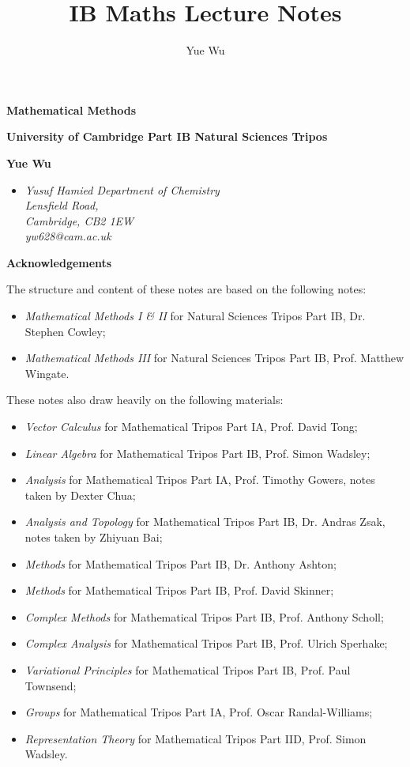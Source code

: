 \documentclass{article}
\title{IB Maths Lecture Notes}
\author{Yue Wu}
\theoremstyle{plain}\theoremheaderfont{\normalfont\itshape}\theorembodyfont{\rmfamily}\theoremseparator{.}\newtheorem*{rem}{Remark}\newtheorem*{ex}{Example}\newtheorem*{proof}{Proof}\newtheorem*{altp}{Alternative proof}
\theoremstyle{plain}\theoremheaderfont{\normalfont\bfseries}\theorembodyfont{\rmfamily}\theoremseparator{.}\newtheorem{thm}{Theorem}[section]\newtheorem{lem}[thm]{Lemma}\newtheorem{prop}[thm]{Proposition}\newtheorem*{cor}{Corollary}\newtheorem{defn}[thm]{Definition}\newtheorem{clm}[thm]{Claim}\newtheorem{clminproof}{Claim}
\theoremstyle{break}\theoremheaderfont{\normalfont\itshape}\theorembodyfont{\rmfamily}\theoremseparator{.\medskip}\newtheorem*{proofskip}{Proof}\newtheorem*{exs}{Examples}\newtheorem*{rems}{Remarks}
\theoremstyle{break}\theoremheaderfont{\normalfont\bfseries}\theorembodyfont{\rmfamily}\theoremseparator{.\medskip}\newtheorem{lemskip}[thm]{Lemma}\newtheorem{defnskip}[thm]{Definition}\newtheorem{propskip}[thm]{Proposition}\newtheorem{thmskip}[thm]{Theorem}
\numberwithin{equation}{section}
\begin{document}
	\setlength{\parindent}{0pt}
	\Huge\textsf{\textbf{Mathematical Methods}}
		
	\Large\textsf{\textbf{University of Cambridge Part IB Natural Sciences Tripos}}

	\noindent\makebox[\linewidth]{\rule{\textwidth}{2pt}}

	\large\textsf{\textbf{Yue Wu}}
	\begin{itemize}[topsep=0pt,leftmargin=15pt]
		\item[] \textit{Yusuf Hamied Department of Chemistry\\
		Lensfield Road,\\
		Cambridge, CB2 1EW}\\

		\textit{yw628@cam.ac.uk}
	\end{itemize}
	\thispagestyle{empty}
    \setlength{\parindent}{15pt}

	\newpage
	\begin{center}
		\textbf{\Large{Acknowledgements}}
	\end{center}
	\normalsize
	The structure and content of these notes are based on the following notes:
	\begin{itemize}[topsep=0pt]
		\item \textit{Mathematical Methods I \& II} for Natural Sciences Tripos Part IB, Dr. Stephen Cowley;
		\item \textit{Mathematical Methods III} for Natural Sciences Tripos Part IB, Prof. Matthew Wingate.
	\end{itemize}
	These notes also draw heavily on the following materials:
	\begin{itemize}[topsep=0pt]
		\item \textit{Vector Calculus} for Mathematical Tripos Part IA, Prof. David Tong;
		\item \textit{Linear Algebra} for Mathematical Tripos Part IB, Prof. Simon Wadsley;
		\item \textit{Analysis} for Mathematical Tripos Part IA, Prof. Timothy Gowers, notes taken by Dexter Chua;
		\item \textit{Analysis and Topology} for Mathematical Tripos Part IB, Dr. Andras Zsak, notes taken by Zhiyuan Bai;
		\item \textit{Methods} for Mathematical Tripos Part IB, Dr. Anthony Ashton;
		\item \textit{Methods} for Mathematical Tripos Part IB, Prof. David Skinner;
		\item \textit{Complex Methods} for Mathematical Tripos Part IB, Prof. Anthony Scholl;
		\item \textit{Complex Analysis} for Mathematical Tripos Part IB, Prof. Ulrich Sperhake;
		\item \textit{Variational Principles} for Mathematical Tripos Part IB, Prof. Paul Townsend;
		\item \textit{Groups} for Mathematical Tripos Part IA, Prof. Oscar Randal-Williams;
		\item \textit{Representation Theory} for Mathematical Tripos Part IID, Prof. Simon Wadsley.
	\end{itemize}
\end{document}
